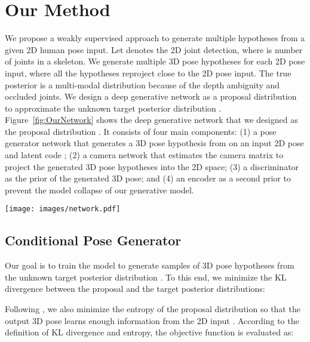 \documentclass{bmvc2k}
\begin{document}
\vspace{-3mm}

\section{Our Method}
We propose a weakly supervised approach to generate multiple hypotheses from a given 2D human pose input. Let  denotes the 2D joint detection, where  is number of joints in a skeleton. We generate multiple 3D pose hypotheses  for each 2D pose input, where all the hypotheses reproject close to the 2D pose input. The true posterior  is a multi-modal distribution because of the depth ambiguity and occluded joints. We design a deep generative network as a proposal distribution  to approximate the unknown target posterior distribution . 
Figure~\ref{fig:OurNetwork} shows the deep generative network that we designed as the proposal distribution . It consists of four main components: (1) a pose generator network that generates a 3D pose hypothesis  from on an input 2D pose  and latent code ; (2) a camera network that estimates the camera matrix  to project the generated 3D pose hypotheses into the 2D space; (3) a discriminator as the prior  of the generated 3D pose; and (4) an encoder as a second prior to prevent the model collapse of our generative model.

\begin{figure*}
\begin{center}
\texttt{[image: images/network.pdf]}

\end{center}
  \vspace{-4mm}
   \caption{Our deep generative network to generate multiple 3D human pose hypotheses. 
   }
 
\label{fig:OurNetwork}
\vspace{-3mm}
\end{figure*}

\subsection{Conditional Pose Generator}
Our goal is to train the model  to generate samples of 3D pose hypotheses from the unknown target posterior distribution . To this end, we minimize the KL divergence between the proposal  and the target posterior  distributions:

Following \cite{chen2016infogan}, we also minimize the entropy of the proposal distribution so that the output 3D pose  learns enough information from the 2D input . 
According to the definition of KL divergence and entropy, the objective function is evaluated as:
\end{document}
